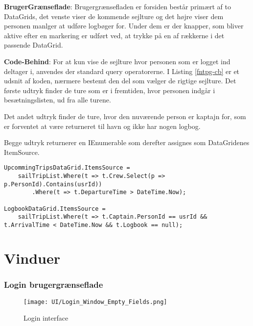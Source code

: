\textbf{BrugerGrænseflade}: 
Brugergrænsefladen er forsiden består primært af to DataGrids, det venste viser de kommende sejlture og det højre viser dem personen manlger at udføre logbøger for. 
Under dem er der knapper, som bliver aktive efter en markering er udført ved, at trykke på en af rækkerne i det passende DataGrid.

\textbf{Code-Behind}: 
For at kun vise de sejlture hvor personen som er logget ind deltager i, anvendes der standard query operatorerne. 
I Listing \ref{fntpg-cb} er et udsnit af koden, nærmere bestemt den del som vælger de rigtige sejlture.
Det første udtryk finder de ture som er i fremtiden, hvor personen indgår i besætningslisten, ud fra alle turene.

Det andet udtryk finder de ture, hvor den nuværende person er kaptajn for, som er forventet at være returneret til havn og ikke har nogen logbog. 

Begge udtryk returnerer en IEnumerable som derefter assignes som DataGridenes ItemSource.

\begin{lstlisting}[frame=single, caption=Forsidens Code-Behind, label=fntpg-cb]
UpcommingTripsDataGrid.ItemsSource =
    sailTripList.Where(t => t.Crew.Select(p => p.PersonId).Contains(usrId))
        .Where(t => t.DepartureTime > DateTime.Now);

LogbookDataGrid.ItemsSource =
    sailTripList.Where(t => t.Captain.PersonId == usrId && t.ArrivalTime < DateTime.Now && t.Logbook == null);
\end{lstlisting}

\section{Vinduer}

\subsubsection{Login brugergrænseflade}
\begin{wrapfigure}{r}{0.5\textwidth}
    \label{img:login_interface}
    \vspace{-20pt}
    \begin{center}
        \texttt{[image: UI/Login\_Window\_Empty\_Fields.png]}
    \end{center}
    \vspace{-15pt}
    \caption{Login interface}
\end{wrapfigure}

